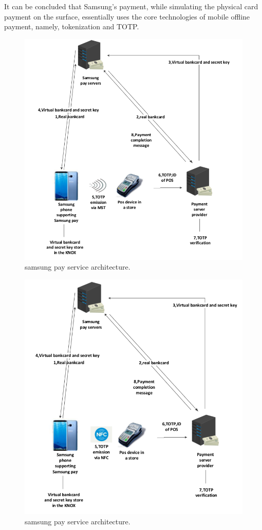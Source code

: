 \documentclass[journal]{IEEEtran}
\begin{document}
It can be concluded that Samsung's payment, while simulating the physical card payment on the surface, essentially uses the core technologies of mobile offline payment, namely, tokenization and TOTP.

\begin{figure}[htbp]
\centerline{\includegraphics[scale=0.35]{sanxingMST2.png}}
\caption{samsung pay service architecture.}
\label{fig}
\end{figure}

\begin{figure}[htbp]
\centerline{\includegraphics[scale=0.35]{sanxingNFC2.png}}
\caption{samsung pay service architecture.}
\label{fig}
\end{figure}
\end{document}
